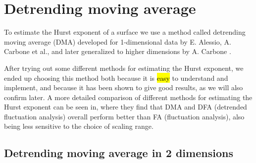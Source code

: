\section{Detrending moving average\label{sec:dma}}
To estimate the Hurst exponent of a surface we use a method called detrending moving average (DMA) developed for 1-dimensional data by E. Alessio, A. Carbone et al.\cite{alessio2002dma}, and later generalized to higher dimensions by A. Carbone \cite{carbone2007algorithm}. 

After trying out some different methods for estimating the Hurst exponent, we ended up choosing this method both because it is \hl{easy} to understand and implement, and because it has been shown to give good results, as we will also confirm later. A more detailed comparison of different methods for estimating the Hurst exponent can be seen in\cite{shao2012comparing}, where they find that DMA and DFA (detrended fluctuation analysis) overall perform better than FA (fluctuation analysis), also being less sensitive to the choice of scaling range.%
%
%

\subsection{Detrending moving average in 2 dimensions}


